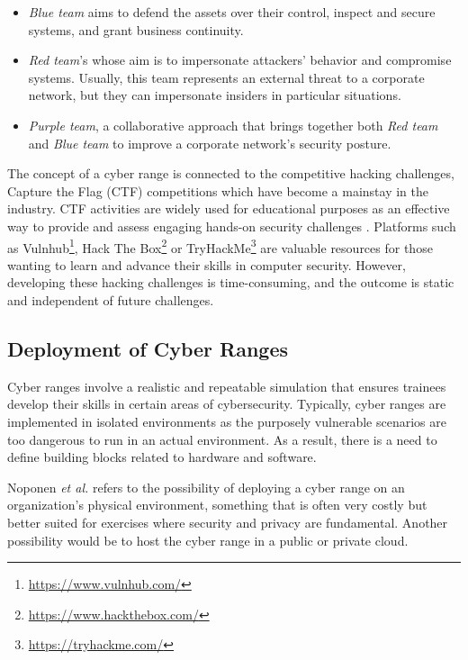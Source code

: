 \begin{itemize}
    \item \textit{Blue team} aims to defend the assets over their control, inspect and secure systems, and grant business continuity.
    \item \textit{Red team}'s whose aim is to impersonate attackers' behavior and compromise systems. Usually, this team represents an external threat to a corporate network, but they can impersonate insiders in particular situations.
    \item \textit{Purple team}, a collaborative approach that brings together both \textit{Red team} and \textit{Blue team} to improve a corporate network's security posture.
\end{itemize}

The concept of a cyber range is connected to the competitive hacking challenges, Capture the Flag (CTF) competitions which have become a mainstay in the industry. CTF activities are widely used for educational purposes as an effective way to provide and assess engaging hands-on security challenges \cite{secgen_ref}. Platforms such as Vulnhub\footnote{\url{https://www.vulnhub.com/}}, Hack The Box\footnote{\url{https://www.hackthebox.com/}} or TryHackMe\footnote{\url{https://tryhackme.com/}} are valuable resources for those wanting to learn and advance their skills in computer security. However, developing these hacking challenges is time-consuming, and the outcome is static and independent of future challenges.

\subsection{Deployment of Cyber Ranges} \label{sec:features_cr}

Cyber ranges involve a realistic and repeatable simulation that ensures trainees develop their skills in certain areas of cybersecurity. Typically, cyber ranges are implemented in isolated environments as the purposely vulnerable scenarios are too dangerous to run in an actual environment. As a result, there is a need to define building blocks related to hardware and software.

Noponen \textit{et al.} \cite{cybersecurity_threat_and_mitigations_ref} refers to the possibility of deploying a cyber range on an organization's physical environment, something that is often very costly but better suited for exercises where security and privacy are fundamental. Another possibility would be to host the cyber range in a public or private cloud. 

